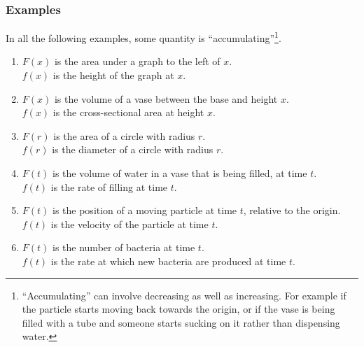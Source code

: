 \subsubsection*{Examples}

In all the following examples, some quantity is
``accumulating''\footnote{``Accumulating'' can involve decreasing as well as
  increasing. For example if the particle starts moving back towards the
  origin, or if the vase is being filled with a tube and someone starts sucking
  on it rather than dispensing water.}.

\begin{enumerate}
\item $F(x)$ is the area under a graph to the left of $x$.\\
      $f(x)$ is the height of the graph at $x$.\\

\item $F(x)$ is the volume of a vase between the base and height $x$. \\
      $f(x)$ is the cross-sectional area at height $x$.\\

\item $F(r)$ is the area of a circle with radius $r$.\\
      $f(r)$ is the diameter of a circle with radius $r$.\\

\item $F(t)$ is the volume of water in a vase that is being filled, at time $t$.\\
      $f(t)$ is the rate of filling at time $t$.\\

\item $F(t)$ is the position of a moving particle at time $t$, relative to the origin.\\
      $f(t)$ is the velocity of the particle at time $t$.\\

\item $F(t)$ is the number of bacteria at time $t$.\\
      $f(t)$ is the rate at which new bacteria are produced at time $t$.
\end{enumerate}

